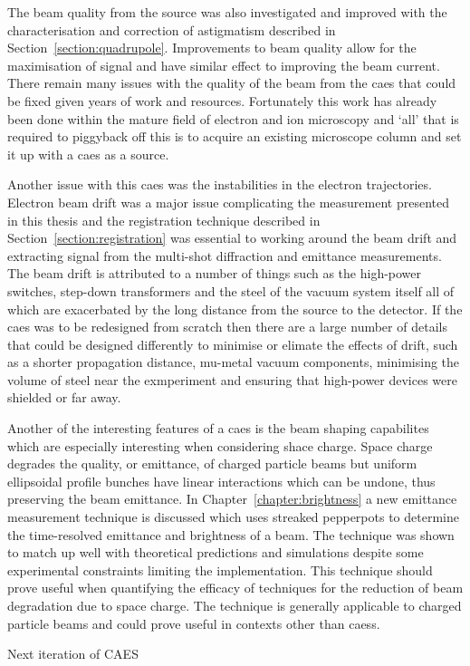 The beam quality from the source was also investigated and improved with the characterisation and correction of astigmatism described in Section~\ref{section:quadrupole}.
Improvements to beam quality allow for the maximisation of signal and have similar effect to improving the beam current.
There remain many issues with the quality of the beam from the \gls{caes} that could be fixed given years of work and resources.
Fortunately this work has already been done within the mature field of electron and ion microscopy and `all' that is required to piggyback off this is to acquire an existing microscope column and set it up with a \gls{caes} as a source.

Another issue with this \gls{caes} was the instabilities in the electron trajectories.
Electron beam drift was a major issue complicating the measurement presented in this thesis and the registration technique described in Section~\ref{section:registration} was essential to working around the beam drift and extracting signal from the multi-shot diffraction and emittance measurements.
The beam drift is attributed to a number of things such as the high-power switches, step-down transformers and the steel of the vacuum system itself all of which are exacerbated by the long distance from the source to the detector.
If the \gls{caes} was to be redesigned from scratch then there are a large number of details that could be designed differently to minimise or elimate the effects of drift, such as a shorter propagation distance, mu-metal vacuum components, minimising the volume of steel near the exmperiment and ensuring that high-power devices were shielded or far away.

Another of the interesting features of a \gls{caes} is the beam shaping capabilites which are especially interesting when considering shace charge.
Space charge degrades the quality, or emittance, of charged particle beams but uniform ellipsoidal profile bunches have linear interactions which can be undone, thus preserving the beam emittance.
In Chapter~\ref{chapter:brightness} a new emittance measurement technique is discussed which uses streaked pepperpots to determine the time-resolved emittance and brightness of a beam.
The technique was shown to match up well with theoretical predictions and simulations despite some experimental constraints limiting the implementation.
This technique should prove useful when quantifying the efficacy of techniques for the reduction of beam degradation due to space charge.
The technique is generally applicable to charged particle beams and could prove useful in contexts other than \glspl{caes}.

Next iteration of CAES